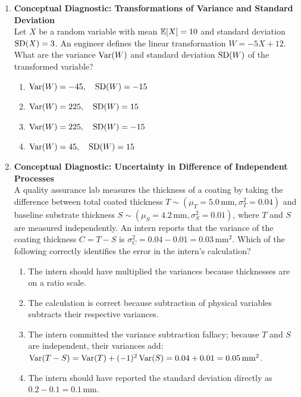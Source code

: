 \begin{enumerate}[resume]
\item \textbf{Conceptual Diagnostic: Transformations of Variance and Standard Deviation} \\
Let $X$ be a random variable with mean $\mathbb{E}[X] = 10$ and standard deviation $\operatorname{SD}(X) = 3$. An engineer defines the linear transformation $W = -5X + 12$. What are the variance $\operatorname{Var}(W)$ and standard deviation $\operatorname{SD}(W)$ of the transformed variable?
\begin{enumerate}
    \item $\operatorname{Var}(W) = -45, \quad \operatorname{SD}(W) = -15$
    \item $\operatorname{Var}(W) = 225, \quad \operatorname{SD}(W) = 15$
    \item $\operatorname{Var}(W) = 225, \quad \operatorname{SD}(W) = -15$
    \item $\operatorname{Var}(W) = 45, \quad \operatorname{SD}(W) = 15$
\end{enumerate}

\item \textbf{Conceptual Diagnostic: Uncertainty in Difference of Independent Processes} \\
A quality assurance lab measures the thickness of a coating by taking the difference between total coated thickness $T \sim (\mu_T = 5.0\,\text{mm}, \sigma_T^2 = 0.04)$ and baseline substrate thickness $S \sim (\mu_S = 4.2\,\text{mm}, \sigma_S^2 = 0.01)$, where $T$ and $S$ are measured independently. An intern reports that the variance of the coating thickness $C = T - S$ is $\sigma_C^2 = 0.04 - 0.01 = 0.03\,\text{mm}^2$. Which of the following correctly identifies the error in the intern's calculation?
\begin{enumerate}
    \item The intern should have multiplied the variances because thicknesses are on a ratio scale.
    \item The calculation is correct because subtraction of physical variables subtracts their respective variances.
    \item The intern committed the variance subtraction fallacy; because $T$ and $S$ are independent, their variances add: $\operatorname{Var}(T - S) = \operatorname{Var}(T) + (-1)^2\operatorname{Var}(S) = 0.04 + 0.01 = 0.05\,\text{mm}^2$.
    \item The intern should have reported the standard deviation directly as $0.2 - 0.1 = 0.1\,\text{mm}$.
\end{enumerate}
\end{enumerate}
